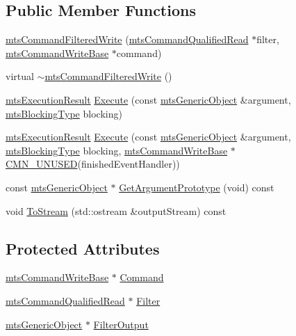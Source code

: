 \subsection*{Public Member Functions}
\begin{DoxyCompactItemize}
\item 
\hyperlink{classmts_command_filtered_write_a36beea3289b7379db2819fb5aea65b9a}{mts\+Command\+Filtered\+Write} (\hyperlink{classmts_command_qualified_read}{mts\+Command\+Qualified\+Read} $\ast$filter, \hyperlink{classmts_command_write_base}{mts\+Command\+Write\+Base} $\ast$command)
\item 
virtual \hyperlink{classmts_command_filtered_write_ae133dcf12e2d87d66149ed366ea0127c}{$\sim$mts\+Command\+Filtered\+Write} ()
\item 
\hyperlink{classmts_execution_result}{mts\+Execution\+Result} \hyperlink{classmts_command_filtered_write_a6324b444c5b118399e3c4b1b3c3cc8dd}{Execute} (const \hyperlink{classmts_generic_object}{mts\+Generic\+Object} \&argument, \hyperlink{mts_forward_declarations_8h_ad7426ccb6c883bc780d0ee197dddcbe7}{mts\+Blocking\+Type} blocking)
\item 
\hyperlink{classmts_execution_result}{mts\+Execution\+Result} \hyperlink{classmts_command_filtered_write_adad546b19cb146481df6f46aef804478}{Execute} (const \hyperlink{classmts_generic_object}{mts\+Generic\+Object} \&argument, \hyperlink{mts_forward_declarations_8h_ad7426ccb6c883bc780d0ee197dddcbe7}{mts\+Blocking\+Type} blocking, \hyperlink{classmts_command_write_base}{mts\+Command\+Write\+Base} $\ast$\hyperlink{cmn_portability_8h_a021894e2626935fa2305434b1e893ff6}{C\+M\+N\+\_\+\+U\+N\+U\+S\+E\+D}(finished\+Event\+Handler))
\item 
const \hyperlink{classmts_generic_object}{mts\+Generic\+Object} $\ast$ \hyperlink{classmts_command_filtered_write_a5bd6b23d95778ef83e4ae4cc0df857fa}{Get\+Argument\+Prototype} (void) const 
\item 
void \hyperlink{classmts_command_filtered_write_a286a6a1e8963a593db2a984914faa1f7}{To\+Stream} (std\+::ostream \&output\+Stream) const 
\end{DoxyCompactItemize}
\subsection*{Protected Attributes}
\begin{DoxyCompactItemize}
\item 
\hyperlink{classmts_command_write_base}{mts\+Command\+Write\+Base} $\ast$ \hyperlink{classmts_command_filtered_write_a58cf3073e6fbdf0874d8aa369d3500cd}{Command}
\item 
\hyperlink{classmts_command_qualified_read}{mts\+Command\+Qualified\+Read} $\ast$ \hyperlink{classmts_command_filtered_write_afbf763a5226ddc747f8dd25219b2e027}{Filter}
\item 
\hyperlink{classmts_generic_object}{mts\+Generic\+Object} $\ast$ \hyperlink{classmts_command_filtered_write_a87da9e319a6eb2fe6f4ca23efbf59bce}{Filter\+Output}
\end{DoxyCompactItemize}
